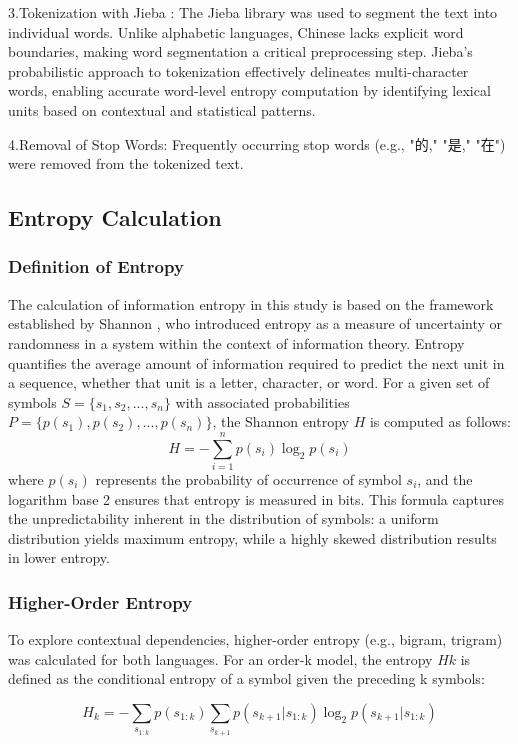 \documentclass[12pt]{article}
\begin{document}
3.Tokenization with Jieba \cite{jieba}: The Jieba library was used to segment the text into individual words. Unlike alphabetic languages, Chinese lacks explicit word boundaries, making word segmentation a critical preprocessing step. Jieba’s probabilistic approach to tokenization effectively delineates multi-character words, enabling accurate word-level entropy computation by identifying lexical units based on contextual and statistical patterns.

4.Removal of Stop Words: Frequently occurring stop words (e.g., "的," "是," "在") were removed from the tokenized text. 
\subsection*{\centering Entropy Calculation}
\subsubsection*{\centering Definition of Entropy}
The calculation of information entropy in this study is based on the framework established by Shannon \cite{shannon1948}, who introduced entropy as a measure of uncertainty or randomness in a system within the context of information theory. Entropy quantifies the average amount of information required to predict the next unit in a sequence, whether that unit is a letter, character, or word. For a given set of symbols $S = \{s_1, s_2, ..., s_n\} $ with associated probabilities $ P = \{p(s_1), p(s_2), ..., p(s_n)\} ​$, the Shannon entropy $H$ is computed as follows:
\begin{equation}
H=−∑_{i=1}^{n}p(s_i)\log_2p(s_i)
\end{equation}
where $p(s_i)$  represents the probability of occurrence of symbol $s_i$​, and the logarithm base 2 ensures that entropy is measured in bits. This formula captures the unpredictability inherent in the distribution of symbols: a uniform distribution yields maximum entropy, while a highly skewed distribution results in lower entropy.
\subsubsection*{\centering Higher-Order Entropy}
To explore contextual dependencies, higher-order entropy (e.g., bigram, trigram) was calculated for both languages. For an order-k  model, the entropy $Hk$ is defined as the conditional entropy of a symbol given the preceding k symbols:

\begin{equation}
H_k = - \sum_{s_{1:k}} p(s_{1:k}) \sum_{s_{k+1}} p(s_{k+1} | s_{1:k}) \log_2 p(s_{k+1} | s_{1:k})
\end{equation}
\end{document}
